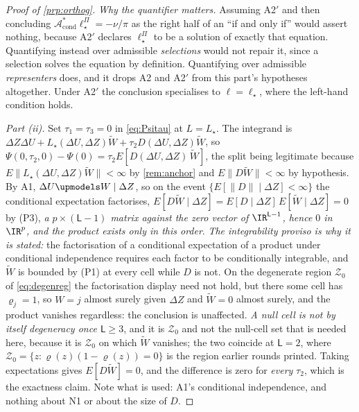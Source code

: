 \begin{proof}[Proof of \cref{prp:orthog}]
\emph{Why the quantifier matters.} Assuming A2$'$ and then concluding
$\mathcal A^\ast_{\mathrm{cond}}\ell^\Pi_\star=-\nu/\pi$ as the right half of an ``if and only if'' would
assert nothing, because A2$'$ declares $\ell^\Pi_\star$ to be
a solution of exactly that equation. Quantifying
instead over admissible \emph{selections} would not repair it, since a selection solves the
equation by definition. Quantifying over admissible \emph{representers} does, and it drops A2 and A2$'$
from this part's hypotheses altogether. Under A2$'$ the conclusion specialises to $\ell=\ell_\star$, where
the left-hand condition holds.

\emph{Part (ii).}
Set $\tau_1=\tau_3=0$ in \eqref{eq:Psitau} at $L=L_\star$. The integrand is
$\Delta Z\Delta U+L_\star(\Delta U,\Delta Z)\widetilde W+\tau_2D(\Delta U,\Delta Z)\widetilde W$, so
$\Psi(0,\tau_2,0)-\Psi(0)=\tau_2E[D(\Delta U,\Delta Z)\,\widetilde W]$, the split being legitimate
because $E\|L_\star(\Delta U,\Delta Z)\widetilde W\|<\infty$ by \cref{rem:anchor} and
$E\|D\widetilde W\|<\infty$ by hypothesis. By A1, $\Delta U\upmodels W\mid\Delta Z$,
so on the event $\{E[\|D\|\mid\Delta Z]<\infty\}$ the conditional expectation factorises,
$E[D\widetilde W\mid\Delta Z]=E[D\mid\Delta Z]\,E[\widetilde W\mid\Delta Z]=0$ by (P3), \emph{a
$p\times(\mathsf L-1)$ matrix against the zero vector of $\IR^{\mathsf L-1}$, hence $0$ in $\IR^{p}$, and
the product exists only in this order}. \emph{The
integrability proviso is why it is stated:} the factorisation of a conditional expectation of a product
under conditional independence requires each factor to be conditionally integrable, and $\widetilde W$ is
bounded by (P1) at every cell while $D$ is not. On the degenerate region $\mathcal Z_0$ of
\eqref{eq:degenreg} the factorisation
display need not hold, but there some cell has $\varrho_j=1$, so $W=j$ almost surely given $\Delta Z$ and
$\widetilde W=0$ almost surely, and the product vanishes regardless: the conclusion is unaffected.
\emph{A null cell is not by itself degeneracy once $\mathsf L\ge3$}, and it is $\mathcal Z_0$ and not the
null-cell set that is needed here, because it is $\mathcal Z_0$ on which $\widetilde W$ vanishes; the two
coincide at $\mathsf L=2$, where $\mathcal Z_0=\{z:\varrho(z)(1-\varrho(z))=0\}$ is the region earlier
rounds printed. Taking expectations gives $E[D\widetilde W]=0$, and the difference is zero
for \emph{every} $\tau_2$, which is the exactness claim. Note what is used: A1's conditional
independence, and nothing about N1 or about the size of $D$.


\end{proof}
